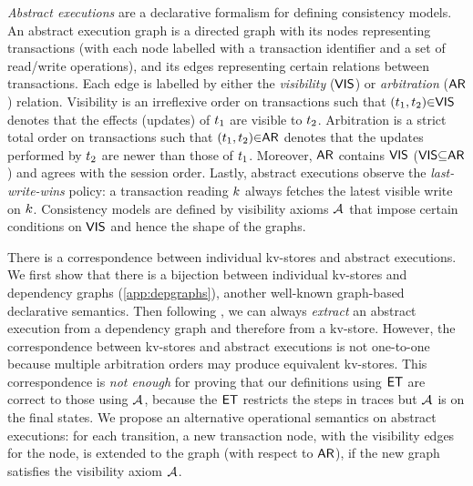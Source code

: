 

\emph{Abstract executions} \cite{ev_transactions,framework-concur} are a declarative formalism for defining consistency models. 
An abstract execution graph is a directed graph with its nodes representing transactions 
(with each node labelled with a transaction identifier and a set of read/write operations), 
and its edges representing certain relations between transactions. 
Each edge is labelled by either the \emph{visibility} ($\mathsf{VIS}$) or \emph{arbitration} ($\mathsf{AR}$) relation. 
Visibility is an irreflexive order on transactions such that $(t_1,t_2) {\in} \mathsf{VIS}$ denotes that the effects (updates) of $t_1$ are visible to $t_2$. 
Arbitration is a strict total order on transactions such that $(t_1,t_2) {\in} \mathsf{AR}$ denotes that the updates performed by $t_2$ are newer than those of $t_1$. 
Moreover, $\mathsf{AR}$ contains $\mathsf{VIS}$ ($\mathsf{VIS} {\subseteq} \mathsf{AR}$) and agrees with the session order.
Lastly, abstract executions observe the \emph{last-write-wins} policy: 
a transaction reading $k$ always fetches the latest visible write on $k$.
Consistency models are defined by visibility axioms \( \visaxioms\) 
that impose certain conditions on $\mathsf{VIS}$ and hence the shape of the graphs.

There is a correspondence between individual kv-stores and abstract executions.
We first show that there is a bijection between individual kv-stores and dependency graphs (\cref{app:depgraphs}),
another well-known graph-based declarative semantics.
Then following \cite{laws}, we can always \emph{extract} an abstract execution
from a dependency graph and therefore from a kv-store.
However, the correspondence between kv-stores and abstract executions is not one-to-one 
because multiple arbitration orders may produce equivalent kv-stores.
This correspondence is \emph{not enough} for proving that 
our definitions using \( \mathsf{ET} \) are correct to those using \( \visaxioms \), 
because the \( \mathsf{ET} \) restricts the steps in traces but \( \visaxioms\) is on the final states.
We propose an alternative operational semantics on abstract executions:
for each transition, 
a new transaction node, with the visibility edges for the node,
is extended to the graph (with respect to \(\mathsf{AR}\)), if the new graph satisfies the visibility axiom \( \visaxioms \).

